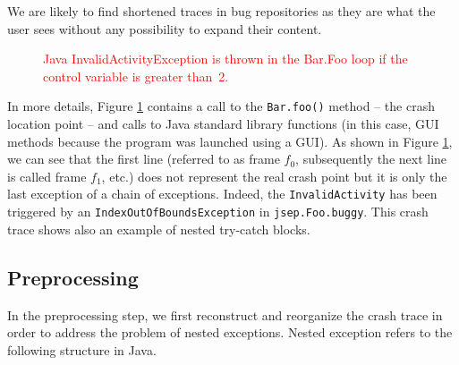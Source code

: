 \documentclass[times, doublespace]{smrauth}
\newcommand{\red}[1]{\textcolor{red}{#1}}
\begin{document}
We are likely to find shortened traces in bug repositories as
they are what the user sees without any possibility to expand
their content.


\begin{figure}
  \noindent{}
    \caption{\red{Java InvalidActivityException is thrown in the Bar.Foo loop if the control variable is greater than~2.}
    \label{fig:jcarming-traces}}
\end{figure}


In more details, Figure \ref{fig:jcarming-traces} contains a call to the {\tt Bar.foo()}
method -- the crash location point -- and calls to Java standard
library functions (in this case, GUI methods because the
program was launched using a GUI).
As shown in Figure \ref{fig:jcarming-traces}, we can see that the first line (referred to
as frame {\it $f_0$}, subsequently the next line is called frame {\it $f_1$}, etc.)
does not represent the real crash point but it is only the last
exception of a chain of exceptions. Indeed, the {\tt InvalidActivity}
has been triggered by an {\tt IndexOutOfBoundsException} in
{\tt jsep.Foo.buggy}. This crash trace shows also an example of nested try-catch blocks.



\subsection{Preprocessing}

In the preprocessing step, we first reconstruct and reorganize
the crash trace in order to address the problem of nested
exceptions. Nested exception refers to the following structure in Java. \\

\noindent{}
\end{document}
